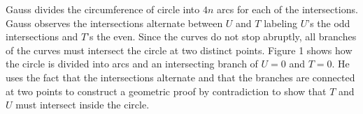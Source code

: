 \documentclass[10pt]{article}
\begin{document}
Gauss divides the circumference of circle into $4n$ arcs for each of the intersections. Gauss observes the intersections alternate between $U$ and $T$ labeling $U$'s the odd intersections and $T$'s the even. 
Since the curves do not stop abruptly, all branches of the curves must intersect the circle at two distinct points. 
Figure 1 shows how the circle is divided into arcs and an intersecting branch of $U=0$ and $T=0$.
He uses the fact that the intersections alternate and that the branches are connected at two points to construct a geometric proof by contradiction to show that $T$ and $U$ must intersect inside the circle.
\end{document}
